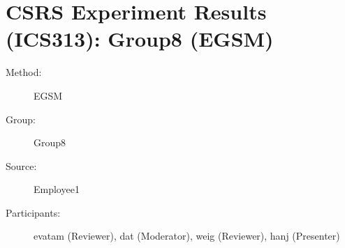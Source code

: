 
%          
\chapter {CSRS Experiment Results (ICS313): Group8 (EGSM)}
\small
	  

\begin{description}
\item [Method:] EGSM
\item [Group:] Group8
\item [Source:] Employee1
\item [Participants:] evatam (Reviewer), dat (Moderator), weig (Reviewer), hanj (Presenter)
\end{description}
